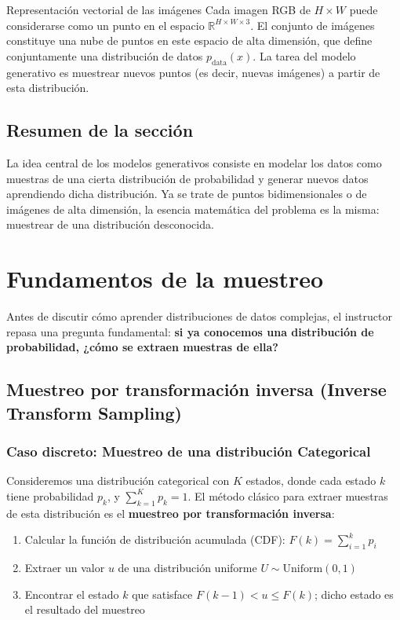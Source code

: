 \documentclass[a4paper]{article}
\begin{document}
\begin{knowledgebox}{Representación vectorial de las imágenes}
Cada imagen RGB de $H \times W$ puede considerarse como un punto en el espacio $\mathbb{R}^{H \times W \times 3}$. El conjunto de imágenes constituye una nube de puntos en este espacio de alta dimensión, que define conjuntamente una distribución de datos $p_{\text{data}}(x)$. La tarea del modelo generativo es muestrear nuevos puntos (es decir, nuevas imágenes) a partir de esta distribución.
\end{knowledgebox}

\subsection{Resumen de la sección}

La idea central de los modelos generativos consiste en modelar los datos como muestras de una cierta distribución de probabilidad y generar nuevos datos aprendiendo dicha distribución. Ya se trate de puntos bidimensionales o de imágenes de alta dimensión, la esencia matemática del problema es la misma: muestrear de una distribución desconocida.

\newpage
\section{Fundamentos de la muestreo}

Antes de discutir cómo aprender distribuciones de datos complejas, el instructor repasa una pregunta fundamental: \textbf{si ya conocemos una distribución de probabilidad, ¿cómo se extraen muestras de ella?}

\subsection{Muestreo por transformación inversa (Inverse Transform Sampling)}

\subsubsection{Caso discreto: Muestreo de una distribución Categorical}

Consideremos una distribución categorical con $K$ estados, donde cada estado $k$ tiene probabilidad $p_k$, y $\sum_{k=1}^K p_k = 1$. El método clásico para extraer muestras de esta distribución es el \textbf{muestreo por transformación inversa}:

\begin{enumerate}
    \item Calcular la función de distribución acumulada (CDF): $F(k) = \sum_{i=1}^{k} p_i$
    \item Extraer un valor $u$ de una distribución uniforme $U \sim \text{Uniform}(0, 1)$
    \item Encontrar el estado $k$ que satisface $F(k-1) < u \leq F(k)$; dicho estado es el resultado del muestreo
\end{enumerate}
\end{document}
